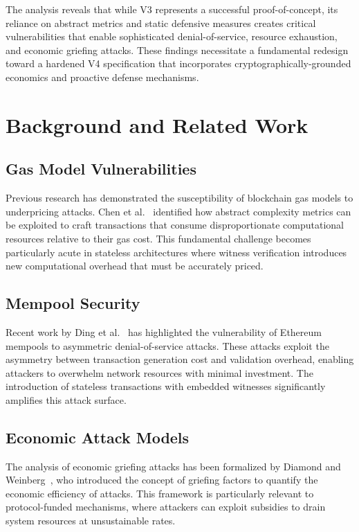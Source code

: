 \documentclass{article}
\begin{document}
The analysis reveals that while V3 represents a successful proof-of-concept, its reliance on abstract metrics and static defensive measures creates critical vulnerabilities that enable sophisticated denial-of-service, resource exhaustion, and economic griefing attacks. These findings necessitate a fundamental redesign toward a hardened V4 specification that incorporates cryptographically-grounded economics and proactive defense mechanisms.

\section{Background and Related Work}

\subsection{Gas Model Vulnerabilities}

Previous research has demonstrated the susceptibility of blockchain gas models to underpricing attacks. Chen et al.~\cite{chen2017adaptive} identified how abstract complexity metrics can be exploited to craft transactions that consume disproportionate computational resources relative to their gas cost. This fundamental challenge becomes particularly acute in stateless architectures where witness verification introduces new computational overhead that must be accurately priced.

\subsection{Mempool Security}

Recent work by Ding et al.~\cite{ding2023mempool} has highlighted the vulnerability of Ethereum mempools to asymmetric denial-of-service attacks. These attacks exploit the asymmetry between transaction generation cost and validation overhead, enabling attackers to overwhelm network resources with minimal investment. The introduction of stateless transactions with embedded witnesses significantly amplifies this attack surface.

\subsection{Economic Attack Models}

The analysis of economic griefing attacks has been formalized by Diamond and Weinberg~\cite{diamond2023griefing}, who introduced the concept of griefing factors to quantify the economic efficiency of attacks. This framework is particularly relevant to protocol-funded mechanisms, where attackers can exploit subsidies to drain system resources at unsustainable rates.
\end{document}
